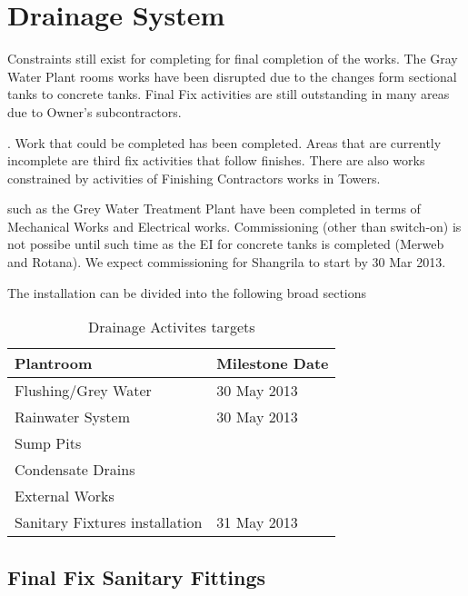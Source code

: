 \chapter{Drainage System}

\begin{update}
Constraints still exist for completing for final completion of the works. The Gray Water Plant rooms works have been disrupted due to the changes form sectional tanks to concrete tanks. Final Fix activities are still outstanding in many areas due to Owner's subcontractors.
\end{update}

. Work that could be completed has been completed. Areas that are currently incomplete are third fix activities that follow finishes. There
are also works constrained by activities of Finishing Contractors works in Towers.


 such as the Grey Water Treatment Plant have been completed in terms of Mechanical Works and Electrical works.
Commissioning (other than switch-on) is not possibe until such time as the EI for concrete tanks is completed (Merweb and Rotana). We expect commissioning for Shangrila to start by 30 Mar 2013.


The installation can be divided into the following broad sections


\begin{center}
           \begin{table} 
	    \begin{tabular}{ll}
	      \toprule
	      Plantroom   &  Milestone Date  \\
	      \midrule
	      Flushing/Grey Water   &    30 May 2013  \\
	      Rainwater System      &    30 May 2013  \\
	      Sump Pits    &    \ch  \\
	     Condensate Drains &\ch\\
	     External Works &\ch \\
	     Sanitary Fixtures installation &31 May 2013 \\ 
	      \bottomrule
	    \end{tabular}
             \caption{Drainage Activites targets}
             \end{table}
          \end{center}

\section{Final Fix Sanitary Fittings}




